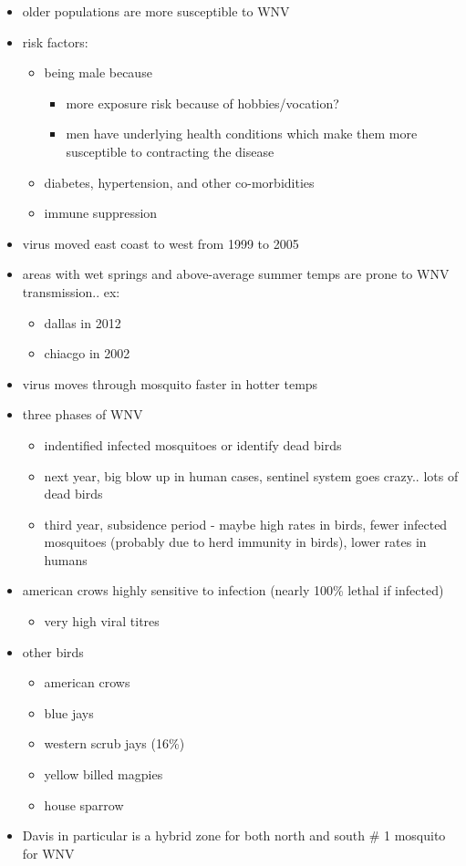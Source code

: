 \documentclass{article}
\begin{document}
\begin{itemize}
        \item older populations are more susceptible to WNV
        \item risk factors:
        \begin{itemize}
            \item being male because
            \begin{itemize}
                \item more exposure risk because of hobbies/vocation?
                \item men have underlying health conditions which make them more susceptible to contracting the disease
            \end{itemize}
            \item diabetes, hypertension, and other co-morbidities
            \item immune suppression
        \end{itemize}
        \item virus moved east coast to west from 1999 to 2005
        \item areas with wet springs and above-average summer temps are prone to WNV transmission.. ex:
        \begin{itemize}
            \item dallas in 2012
            \item chiacgo in 2002
        \end{itemize}
        \item virus moves through mosquito faster in hotter temps
        \item three phases of WNV
        \begin{itemize}
            \item indentified infected mosquitoes or identify dead birds
            \item next year, big blow up in human cases, sentinel system goes crazy.. lots of dead birds
            \item third year, subsidence period - maybe high rates in birds, fewer infected mosquitoes (probably due to herd immunity in birds), lower rates in humans
        \end{itemize}
        \item american crows highly sensitive to infection (nearly 100\% lethal if infected)
        \begin{itemize}
            \item very high viral titres
        \end{itemize}
        \item other birds
        \begin{itemize}
            \item american crows
            \item blue jays
            \item western scrub jays (16\%)
            \item yellow billed magpies
            \item house sparrow
        \end{itemize}
        \item Davis in particular is a hybrid zone for both north and south \# 1 mosquito for WNV
    \end{itemize}
\end{document}
